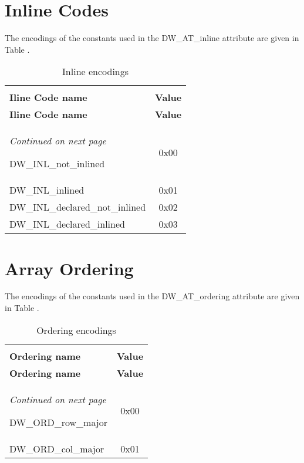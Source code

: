 \section{Inline Codes}
\label{datarep:inlinecodes}

The encodings of the constants used in the 
DW\_AT\_inline attribute are given in 
Table .

\begin{centering}
\setlength{\extrarowheight}{0.1cm}
\begin{longtable}{l|c}
  \caption{Inline encodings} \label{tab:inlineencodings}\\
  \hline \\ \bfseries Iline Code name&\bfseries Value \\ \hline
\endfirsthead
  \bfseries Iline Code name&\bfseries Value\\ \hline
\endhead
  \hline \emph{Continued on next page}
\endfoot
  \hline
\endlastfoot

DW\_INL\_not\_inlined&0x00      \\
DW\_INL\_inlined&0x01      \\
DW\_INL\_declared\_not\_inlined&0x02      \\
DW\_INL\_declared\_inlined&0x03      \\

\end{longtable}
\end{centering}

\clearpage
\section{Array Ordering}
\label{datarep:arrayordering}

The encodings of the constants used in the 
DW\_AT\_ordering attribute are given in 
Table .

\begin{centering}
\setlength{\extrarowheight}{0.1cm}
\begin{longtable}{l|c}
  \caption{Ordering encodings} \label{tab:orderingencodings}\\
  \hline \\ \bfseries Ordering name&\bfseries Value \\ \hline
\endfirsthead
  \bfseries Ordering name&\bfseries Value\\ \hline
\endhead
  \hline \emph{Continued on next page}
\endfoot
  \hline
\endlastfoot

DW\_ORD\_row\_major&0x00  \\
DW\_ORD\_col\_major&0x01  \\

\end{longtable}
\end{centering}


